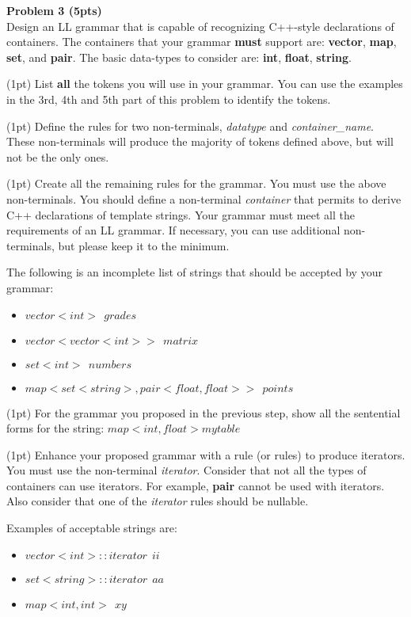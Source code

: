 
\noindent
{\bf Problem 3 (5pts)}\\

Design an LL grammar that is capable of recognizing C++-style declarations of containers. The containers that your grammar
{\bf must} support are: {\bf vector}, {\bf map}, {\bf set}, and  {\bf pair}. The basic data-types to consider are: {\bf int}, {\bf float}, {\bf string}.

\noindent
(1pt) List {\bf all} the tokens you will use in your grammar. You can use the examples in the 3rd, 4th and 5th part of this problem to identify the tokens.

\vspace{2.5in}

\noindent
(1pt) Define the rules for two non-terminals, {\em datatype} and {\em container\_name}. These non-terminals will produce the majority of
tokens defined above, but will not be the only ones.


\vspace{2.5in}

\noindent
(1pt) Create all the remaining rules for the grammar. You must use the above non-terminals. 
You should define a non-terminal {\em container} that permits to derive C++ declarations of template strings.
Your grammar must meet all the requirements of an LL grammar. If necessary, you can use additional non-terminals, but please keep it to the minimum.

The following is an incomplete list of strings that should be accepted by your grammar:
\begin{itemize}
\item $vector<int>~~ grades $
\item $vector<vector<int>>~~ matrix$
\item $set<int>~~ numbers$
\item $map<set<string>,pair<float,float>>~~ points$
\end{itemize}



\vspace{3in}

\noindent
(1pt) For the grammar you proposed in the previous step, show all the sentential forms for the string: $map<int,float> mytable$



\vspace{3in}

\noindent
(1pt) Enhance your proposed grammar with a rule (or rules) to produce iterators. You must use the non-terminal {\em iterator}. Consider that not all the types of
containers can use iterators. For example, {\bf pair} cannot be used with iterators. Also consider that one of the {\em iterator} rules should
be nullable.

Examples of acceptable strings are:

\begin{itemize}
\item $vector<int>::iterator~~ii$
\item $set<string>::iterator~~aa$
\item $map<int,int>~~xy$
\end{itemize}

\vspace{2in}
